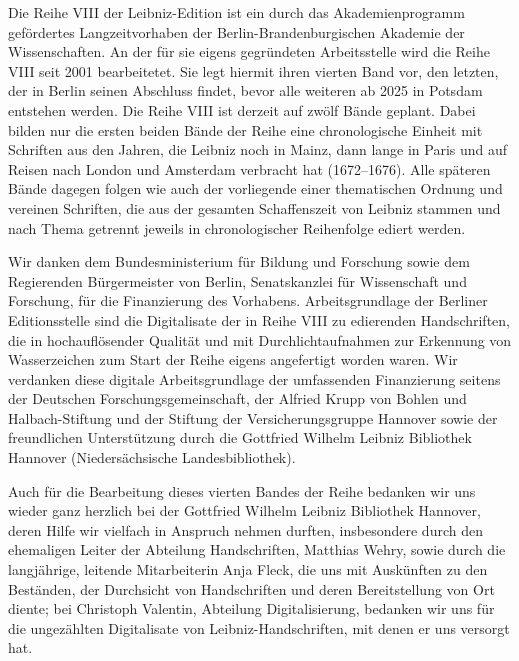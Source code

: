 \vspace*{-2em}
\par\noindent 
Die Reihe VIII der Leibniz-Edition ist ein durch das Akademienprogramm gefördertes Langzeitvorhaben der Berlin-Brandenburgischen Akademie der Wissenschaften. An der für sie eigens gegründeten Arbeitsstelle wird die Reihe VIII seit 2001 bearbeitetet. Sie legt hiermit ihren vierten Band vor, den letzten, der in Berlin seinen Abschluss findet, bevor alle weiteren ab 2025 in Potsdam entstehen werden. %
Die Reihe VIII ist derzeit auf zwölf Bände geplant. Dabei bilden nur die ersten beiden Bände der Reihe eine chronologische Einheit mit Schriften aus den Jahren, die Leibniz noch in Mainz, dann lange in Paris und auf Reisen nach London und Amsterdam verbracht hat (1672--1676). Alle späteren Bände dagegen folgen wie auch der vorliegende einer thematischen Ordnung und vereinen Schriften, die aus der gesamten Schaffenszeit von Leibniz stammen und nach Thema getrennt jeweils in chronologischer Reihenfolge ediert werden.%
\par%
Wir danken dem Bundesministerium für Bildung und Forschung sowie dem Regierenden Bürgermeister von Berlin, Senatskanzlei für Wissenschaft und Forschung, für die Finanzierung des Vorhabens. 
Arbeitsgrundlage der Berliner Editionsstelle sind die Digitalisate der in Reihe VIII zu edierenden Handschriften, die in hochauflösender Qualität und mit Durchlichtaufnahmen zur Erkennung von Wasserzeichen zum Start der Reihe eigens angefertigt worden waren. Wir verdanken diese digitale Arbeitsgrundlage der umfassenden Finanzierung seitens der Deutschen Forschungsgemeinschaft, der Alfried Krupp von Bohlen und Halbach-Stiftung und der Stiftung der Versicherungsgruppe Hannover sowie der freundlichen Unterstützung durch die Gottfried Wilhelm Leibniz Bibliothek Hannover (Niedersächsische Landesbibliothek). 
\par%
Auch für die Bearbeitung dieses vierten Bandes der Reihe bedanken wir uns wieder ganz herzlich bei der Gottfried Wilhelm Leibniz Bibliothek Hannover, deren Hilfe wir vielfach in Anspruch nehmen durften, insbesondere durch den ehemaligen Leiter der Abteilung Handschriften, Matthias Wehry, sowie durch die langjährige, leitende Mitarbeiterin Anja Fleck, die uns mit Auskünften zu den Beständen, der Durchsicht von Handschriften und deren Bereitstellung von Ort diente; bei Christoph Valentin, Abteilung Digitalisierung, bedanken wir uns für die ungezählten Digitalisate von Leibniz-Handschriften, mit denen er uns versorgt hat.
